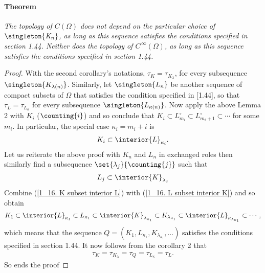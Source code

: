 \paragraph{Theorem}{\it 
The topology of %
%
$\mathit{C(\Omega)}$ %
%
does not depend on the particular choice of %
%
$\mathit{\singleton{K_n}}$, %
%
as long as this sequence satisfies the conditions specified in section 1.44. %
Neither does the topology of %
%
$\mathit{C^{\,\infty} (\Omega)}$, %
%
as long as this sequence satisfies the conditions specified in section 1.44.
}
%
\begin{proof}%
With the second corollary's notations,
% 
  $\tau_{K} = \tau_{K_\lambda}$,
%
for every subsequence $\singleton{K_{\lambda(n)}}$.
% 
Similarly, let 
%
  $\singleton{L_n}$ 
% 
be another sequence of compact subsets of $\Omega$ that satisfies 
the condition specified in [1.44], 
so that 
%
  $\tau_{L} = \tau_{L_\kappa}$
%
for every subsequence $\singleton{L_{\kappa(n)}}$. 
%
Now apply the above Lemma 2 with $K_i$ ($\counting{i}$) and so conclude that  
%
  $K_i 
    \subset 
  L^\circ_{m_i} 
    \subset 
  L^\circ_{m_{i}+1}
    \subset
  \cdots$
%  
for some $m_i$. In particular, the special case $\kappa_i = m_i + i$ is 
%
  \begin{align}
    \label{1_16. K subset interior L}
    K_i
      \subset 
    \interior{L}_{\kappa_i}.
  \end{align} 
%
Let us reiterate the above proof with $K_n$ and $L_n$ in exchanged roles 
then similarly find a subsequence $\set{\lambda_j}{\counting{j}}$ such that 
%
  \begin{align}
  \label{1_16. L subset interior K}
    L_j \subset \interior{K}_{\lambda_j}
  \end{align}
%
Combine 
%
  (\ref{1_16. K subset interior L}) with 
  (\ref{1_16. L subset interior K}) 
%
and so obtain
%
  \begin{align}
    K_1 
      \subset 
    \interior{L}_{\kappa_1} 
      \subset 
    L_{\kappa_1} 
      \subset 
    \interior{K}_{\lambda_{\kappa_1}}
      \subset 
    K_{\lambda_{\kappa_1}}
      \subset
    \interior{L}_{\kappa_{\lambda_{\kappa_1}}}
      \subset
    \cdots, 
  \end{align}
%
which means that the sequence 
%
  $Q = (
    K_1, 
    L_{\kappa_1}, 
    K_{\lambda_{\kappa_1}}, 
    \dots
  )$
%
satisfies the conditions specified in section 1.44. 
It now follows from the corollary 2 that 
%
  \begin{align}  
    \tau_{K} 
    = 
      \tau_{K_\lambda} 
    = 
      \tau_{Q} 
    = 
      \tau_{L_\kappa} 
    = \tau_{L}.
  \end{align} 
%
So ends the proof
\end{proof}
